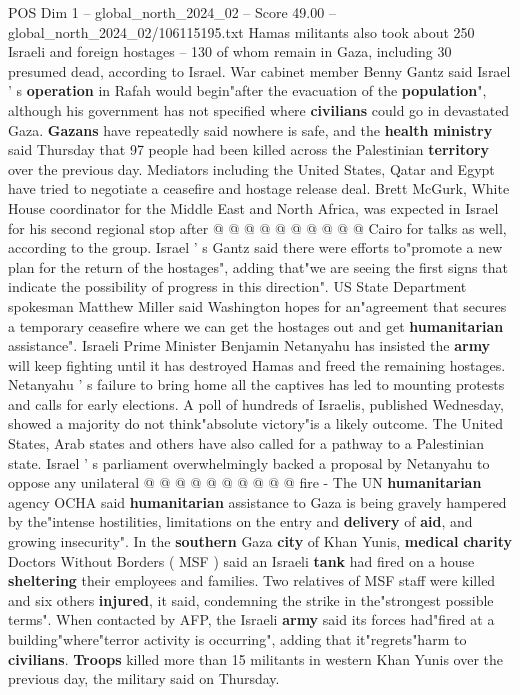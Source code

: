 \begin{textsample}{POS Dim 1 – global\_north\_2024\_02 – Score 49.00 – global\_north\_2024\_02/106115195.txt}
Hamas militants also took about 250 Israeli and foreign hostages -- 130 of whom remain in Gaza, including 30 presumed dead, according to Israel.
War cabinet member Benny Gantz said Israel ' s \textbf{operation} in Rafah would begin"after the evacuation of the \textbf{population}", although his government has not specified where \textbf{civilians} could go in devastated Gaza. \textbf{Gazans} have repeatedly said nowhere is safe, and the \textbf{health} \textbf{ministry} said Thursday that 97 people had been killed across the Palestinian \textbf{territory} over the previous day.
Mediators including the United States, Qatar and Egypt have tried to negotiate a ceasefire and hostage release deal.
Brett McGurk, White House coordinator for the Middle East and North Africa, was expected in Israel for his second regional stop after @ @ @ @ @ @ @ @ @ @ Cairo for talks as well, according to the group.
Israel ' s Gantz said there were efforts to"promote a new plan for the return of the hostages", adding that"we are seeing the first signs that indicate the possibility of progress in this direction".
US State Department spokesman Matthew Miller said Washington hopes for an"agreement that secures a temporary ceasefire where we can get the hostages out and get \textbf{humanitarian} assistance".
Israeli Prime Minister Benjamin Netanyahu has insisted the \textbf{army} will keep fighting until it has destroyed Hamas and freed the remaining hostages.
Netanyahu ' s failure to bring home all the captives has led to mounting protests and calls for early elections.
A poll of hundreds of Israelis, published Wednesday, showed a majority do not think"absolute victory"is a likely outcome.
The United States, Arab states and others have also called for a pathway to a Palestinian state.
Israel ' s parliament overwhelmingly backed a proposal by Netanyahu to oppose any unilateral @ @ @ @ @ @ @ @ @ @ fire - The UN \textbf{humanitarian} agency OCHA said \textbf{humanitarian} assistance to Gaza is being gravely hampered by the"intense hostilities, limitations on the entry and \textbf{delivery} of \textbf{aid}, and growing insecurity".
In the \textbf{southern} Gaza \textbf{city} of Khan Yunis, \textbf{medical} \textbf{charity} Doctors Without Borders ( MSF ) said an Israeli \textbf{tank} had fired on a house \textbf{sheltering} their employees and families.
Two relatives of MSF staff were killed and six others \textbf{injured}, it said, condemning the strike in the"strongest possible terms".
When contacted by AFP, the Israeli \textbf{army} said its forces had"fired at a building"where"terror activity is occurring", adding that it"regrets"harm to \textbf{civilians}. \textbf{Troops} killed more than 15 militants in western Khan Yunis over the previous day, the military said on Thursday.

\end{textsample}
